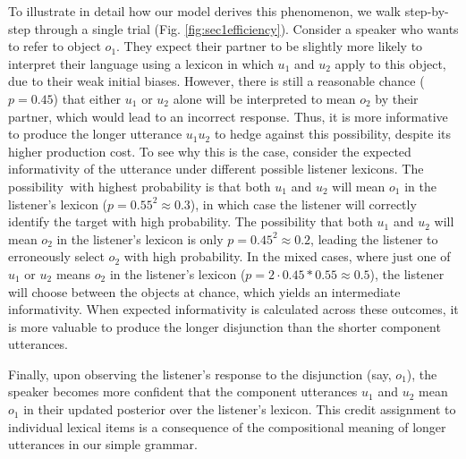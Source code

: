 To illustrate in detail how our model derives this phenomenon, we walk step-by-step through a single trial (Fig. \ref{fig:sec1efficiency}).
Consider a speaker who wants to refer to object $o_1$. 
They expect their partner to be slightly more likely to interpret their language using a lexicon in which $u_{1}$ and $u_{2}$ apply to this object, due to their weak initial biases. 
However, there is still a reasonable chance ($p=0.45$) that either $u_1$ or $u_2$ alone will be interpreted to mean $o_2$ by their partner, which would lead to an incorrect response. 
Thus, it is more informative to produce the longer utterance $u_{1}u_{2}$ to hedge against this possibility, despite its higher production cost. 
To see why this is the case, consider the expected informativity of the utterance under different possible listener lexicons.
The possibility with highest probability is that both $u_1$ and $u_2$ will mean $o_1$ in the listener's lexicon ($p = 0.55^2 \approx 0.3$), in which case the listener will correctly identify the target with high probability.
The possibility that both $u_1$ and $u_2$ will mean $o_2$ in the listener's lexicon is only $p=0.45^2 \approx 0.2$, leading the listener to erroneously select $o_2$ with high probability. 
In the mixed cases, where just one of $u_1$ or $u_2$ means $o_2$ in the listener's lexicon ($p = 2 \cdot 0.45 * 0.55 \approx 0.5$), the listener will choose between the objects at chance, which yields an intermediate informativity.
When expected informativity is calculated across these outcomes, it is more valuable to produce the longer disjunction than the shorter component utterances.

Finally, upon observing the listener's response to the disjunction (say, $o_1$), the speaker becomes more confident that the component utterances $u_1$ and $u_2$ mean $o_1$ in their updated posterior over the listener's lexicon.
This credit assignment to individual lexical items is a consequence of the compositional meaning of longer utterances in our simple grammar. 

